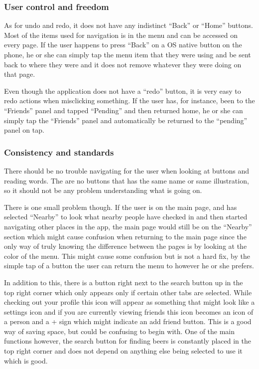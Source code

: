 \documentclass[12pt]{article}
\begin{document}
\subsubsection{User control and freedom}
As for undo and redo, it does not have any indistinct “Back” or “Home” buttons.
Most of the items used for navigation is in the menu and can be accessed on
every page. If the user happens to press “Back” on a OS native button on the
phone, he or she can simply tap the menu item that they were using and be sent
back to where they were and it does not remove whatever they were doing on that
page. 


Even though the application does not have a “redo” button, it is very easy to redo
actions when misclicking something. If the user has, for instance, been to the
“Friends” panel and tapped “Pending” and then returned home, he or she can
simply tap the “Friends” panel and automatically be returned to the “pending”
panel on tap.  


\subsubsection{Consistency and standards}
There should be no trouble navigating for the user when looking at buttons and
reading words. The are no buttons that has the same name or same illustration,
so it should not be any problem understanding what is going on. 


There is one small problem though. If the user is on the main page, and has
selected “Nearby” to look what nearby people have checked in and then started
navigating other places in the app, the main page would still be on the “Nearby”
section which might cause confusion when returning to the main page since the
only way of truly knowing the difference between the pages is by looking at the
color of the menu. This might cause some confusion but is not a hard fix, by the
simple tap of a button the user can return the menu to however he or she
prefers. 


In addition to this, there is a button right next to the search button up in the
top right corner which only appears only if certain other tabs are selected.
While checking out your profile this icon will appear as something that might
look like a settings icon and if you are currently viewing friends this icon
becomes an icon of a person and a + sign which might indicate an add friend
button. This is a good way of saving space, but could be confusing to begin
with. One of the main functions however, the search button for finding beers is
constantly placed in the top right corner and does not depend on anything else
being selected to use it which is good. 
\end{document}
